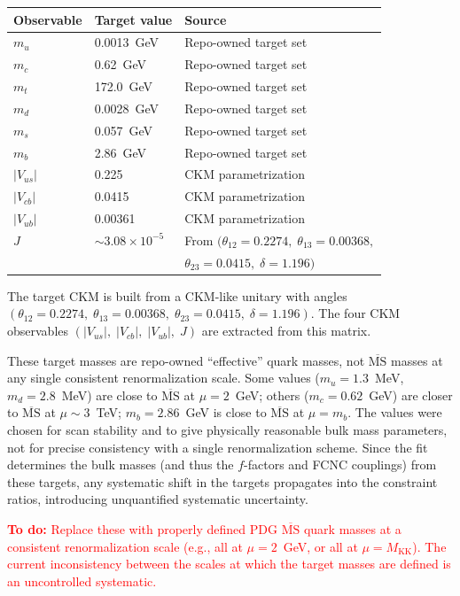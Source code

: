 \documentclass[11pt]{article}
\newcommand{\Mkk}{M_{\mathrm{KK}}}
\begin{document}
\begin{table}[h]
\centering
\begin{tabular}{@{}lll@{}}
\toprule
Observable & Target value & Source \\
\midrule
$m_u$ & 0.0013~GeV & Repo-owned target set \\
$m_c$ & 0.62~GeV & Repo-owned target set \\
$m_t$ & 172.0~GeV & Repo-owned target set \\
$m_d$ & 0.0028~GeV & Repo-owned target set \\
$m_s$ & 0.057~GeV & Repo-owned target set \\
$m_b$ & 2.86~GeV & Repo-owned target set \\
$|V_{us}|$ & 0.225 & CKM parametrization \\
$|V_{cb}|$ & 0.0415 & CKM parametrization \\
$|V_{ub}|$ & 0.00361 & CKM parametrization \\
$J$ & $\sim 3.08\times10^{-5}$ &
  From $(\theta_{12}{=}0.2274,\;\theta_{13}{=}0.00368,$\\
  && $\theta_{23}{=}0.0415,\;\delta{=}1.196)$ \\
\bottomrule
\end{tabular}
\end{table}

The target CKM is built from a CKM-like unitary with angles
$(\theta_{12}=0.2274,\;\theta_{13}=0.00368,\;\theta_{23}=0.0415,\;
\delta=1.196)$.  The four CKM observables $(|V_{us}|,\;|V_{cb}|,\;|V_{ub}|,\;
J)$ are extracted from this matrix.

These target masses are repo-owned ``effective'' quark
masses, not $\overline{\mathrm{MS}}$ masses at any single consistent
renormalization scale.  Some values ($m_u = 1.3$~MeV, $m_d = 2.8$~MeV) are
close to $\overline{\mathrm{MS}}$ at $\mu = 2$~GeV; others
($m_c = 0.62$~GeV) are closer to $\overline{\mathrm{MS}}$ at
$\mu \sim 3$~TeV; $m_b = 2.86$~GeV is close to $\overline{\mathrm{MS}}$ at
$\mu = m_b$.  The values were chosen for scan stability and to give physically
reasonable bulk mass parameters, not for precise consistency with a single
renormalization scheme.  Since the fit determines the bulk masses (and thus the
$f$-factors and FCNC couplings) from these targets, any systematic shift in
the targets propagates into the constraint ratios, introducing unquantified
systematic uncertainty.

\textcolor{red}{\textbf{To do:} Replace these with properly defined PDG
$\overline{\mathrm{MS}}$ quark masses at a consistent renormalization scale
(e.g., all at $\mu = 2$~GeV, or all at $\mu = \Mkk$).  The current
inconsistency between the scales at which the target masses are defined is
an uncontrolled systematic.}
\end{document}
